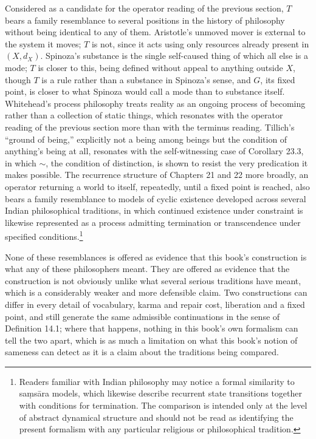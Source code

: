 \documentclass[11pt]{book}
\begin{document}
Considered as a candidate for the operator reading of the previous section, $T$ bears a family resemblance to several positions in the history of philosophy without being identical to any of them. Aristotle's unmoved mover is external to the system it moves; $T$ is not, since it acts using only resources already present in $(X, d_X)$. Spinoza's substance is the single self-caused thing of which all else is a mode; $T$ is closer to this, being defined without appeal to anything outside $X$, though $T$ is a rule rather than a substance in Spinoza's sense, and $G$, its fixed point, is closer to what Spinoza would call a mode than to substance itself. Whitehead's process philosophy treats reality as an ongoing process of becoming rather than a collection of static things, which resonates with the operator reading of the previous section more than with the terminus reading. Tillich's ``ground of being,'' explicitly not a being among beings but the condition of anything's being at all, resonates with the self-witnessing case of Corollary 23.3, in which $\sim$, the condition of distinction, is shown to resist the very predication it makes possible. The recurrence structure of Chapters 21 and 22 more broadly, an operator returning a world to itself, repeatedly, until a fixed point is reached, also bears a family resemblance to models of cyclic existence developed across several Indian philosophical traditions, in which continued existence under constraint is likewise represented as a process admitting termination or transcendence under specified conditions.\footnote{Readers familiar with Indian philosophy may notice a formal similarity to saṃsāra models, which likewise describe recurrent state transitions together with conditions for termination. The comparison is intended only at the level of abstract dynamical structure and should not be read as identifying the present formalism with any particular religious or philosophical tradition.}

None of these resemblances is offered as evidence that this book's construction is what any of these philosophers meant. They are offered as evidence that the construction is not obviously unlike what several serious traditions have meant, which is a considerably weaker and more defensible claim. Two constructions can differ in every detail of vocabulary, karma and repair cost, liberation and a fixed point, and still generate the same admissible continuations in the sense of Definition 14.1; where that happens, nothing in this book's own formalism can tell the two apart, which is as much a limitation on what this book's notion of sameness can detect as it is a claim about the traditions being compared.
\end{document}
